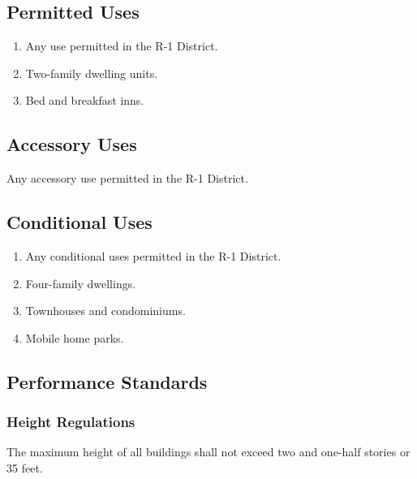 \subsection{Permitted Uses}
\begin{enumerate}[{\indent}1)]
    \item Any use permitted in the R-1 District.  
    \item Two-family dwelling units.
    \item Bed and breakfast inns.
\end{enumerate}
\subsection{Accessory Uses}
Any accessory use permitted in the R-1 District.
\subsection{Conditional Uses}
\begin{enumerate}[{\indent}1)]
    \item Any conditional uses permitted in the R-1 District.
    \item Four-family dwellings.
    \item Townhouses and condominiums.  
    \item Mobile home parks.
\end{enumerate}
\subsection{Performance Standards}
\subsubsection{Height Regulations}
The maximum height of all buildings shall not exceed two and one-half stories or 35 feet.
